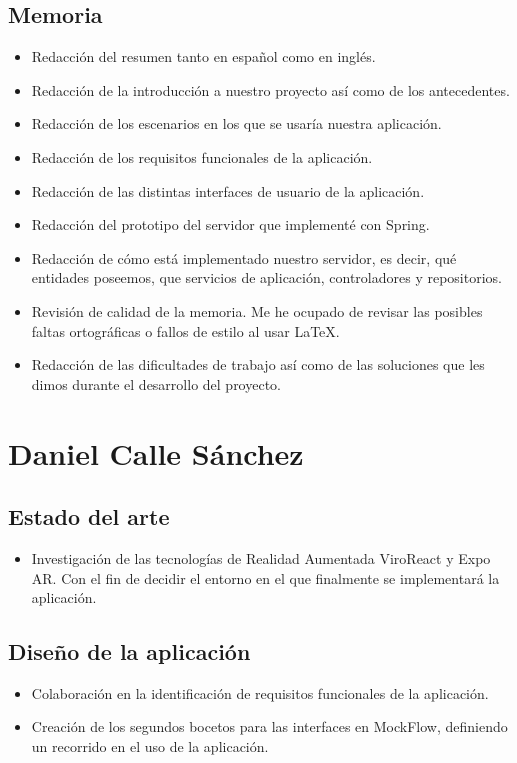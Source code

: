     \subsection{Memoria}
    \label{makereference7.1.3}
        \begin{itemize}
            \item Redacción del resumen tanto en español como en inglés.
            \item Redacción de la introducción a nuestro proyecto así como de los antecedentes.
            \item Redacción de los escenarios en los que se usaría nuestra aplicación.
            \item Redacción de los requisitos funcionales de la aplicación.
            \item Redacción de las distintas interfaces de usuario de la aplicación.
            \item Redacción del prototipo del servidor que implementé con Spring.
            \item Redacción de cómo está implementado nuestro servidor, es decir, qué entidades poseemos, que servicios de aplicación, controladores y repositorios.
            \item Revisión de calidad de la memoria. Me he ocupado de revisar las posibles faltas ortográficas o fallos de estilo al usar LaTeX.
            \item Redacción de las dificultades de trabajo así como de las soluciones que les dimos durante el desarrollo del proyecto.
        \end{itemize}

\section{Daniel Calle Sánchez}
\label{makereference7.2}
    \subsection{Estado del arte}
    \label{makereference7.2.1}
        \begin{itemize}
            \item Investigación de las tecnologías de Realidad Aumentada ViroReact y
            Expo AR. Con el fin de decidir el entorno en el que finalmente se implementará la aplicación.
        \end{itemize}
    \subsection{Diseño de la aplicación}
    \label{makereference7.2.2}
        \begin{itemize}
            \item Colaboración en la identificación de requisitos funcionales de la aplicación.
            \item Creación de los segundos bocetos para las interfaces en
             MockFlow, definiendo un recorrido en el uso de la aplicación.
        \end{itemize}
